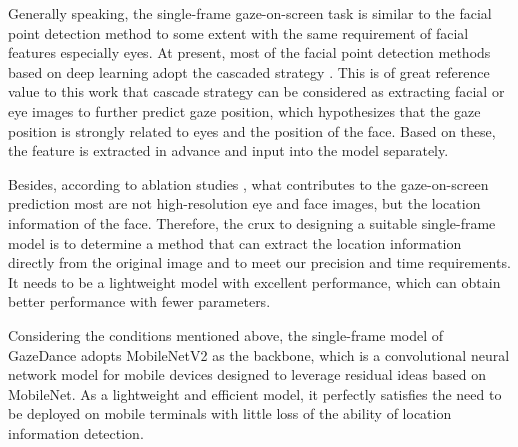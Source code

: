 \documentclass[acmlarge]{acmart}
\begin{document}


Generally speaking, the single-frame gaze-on-screen task is similar to the facial point detection method to some extent with the same requirement of facial features especially eyes. At present, most of the facial point detection methods based on deep learning adopt the cascaded strategy \cite{sun2013deep, zhou2013extensive, zhang2016joint}. This is of great reference value to this work that cascade strategy can be considered as extracting facial or eye images to further predict gaze position, which hypothesizes that the gaze position is strongly related to eyes and the position of the face. Based on these, the feature is extracted in advance and input into the model separately. 


Besides, according to ablation studies \cite{krafka2016eye}, what contributes to the gaze-on-screen prediction most are not high-resolution eye and face images, but the location information of the face. Therefore, the crux to designing a suitable single-frame model is to determine a method that can extract the location information directly from the original image and to meet our precision and time requirements. It needs to be a lightweight model with excellent performance, which can obtain better performance with fewer parameters.

Considering the conditions mentioned above, the single-frame model of GazeDance adopts MobileNetV2 \cite{sandler2018mobilenetv2} as the backbone, which is a convolutional neural network model for mobile devices designed to leverage residual ideas based on MobileNet. As a lightweight and efficient model, it perfectly satisfies the need to be deployed on mobile terminals with little loss of the ability of location information detection.
\end{document}
